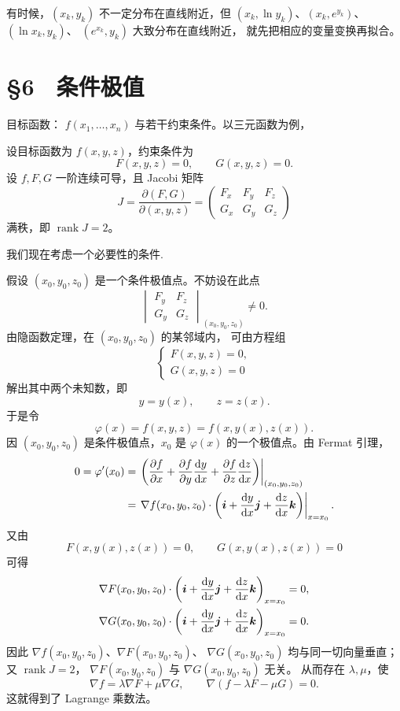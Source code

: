 有时候，$(x_k,y_k)$ 不一定分布在直线附近，但
$(x_k,\ln y_k)$、$(x_k,e^{y_k})$、$(\ln x_k,y_k)$、
$(e^{x_k},y_k)$ 大致分布在直线附近，
就先把相应的变量变换再拟合。







\section*{§6　条件极值}

目标函数： $f(x_1,\ldots,x_n)$ 与若干约束条件。以三元函数为例，


设目标函数为 $f(x,y,z)$，约束条件为
\[
F(x,y,z)=0,\qquad G(x,y,z)=0.
\]
设 $f,F,G$ 一阶连续可导，且 Jacobi 矩阵
\[
J=\frac{\partial(F,G)}{\partial(x,y,z)}
=\begin{pmatrix}
F_x&F_y&F_z\\
G_x&G_y&G_z
\end{pmatrix}
\]
满秩，即 $\operatorname{rank}J=2$。

我们现在考虑一个必要性的条件.

假设 $(x_0,y_0,z_0)$ 是一个条件极值点。不妨设在此点
\[
\begin{vmatrix}
F_y&F_z\\
G_y&G_z
\end{vmatrix}_{(x_0,y_0,z_0)}\ne0.
\]
由隐函数定理，在 $(x_0,y_0,z_0)$ 的某邻域内，
可由方程组
\[
\begin{cases}
F(x,y,z)=0,\\
G(x,y,z)=0
\end{cases}
\]
解出其中两个未知数，即
\[
y=y(x),\qquad z=z(x).
\]
于是令
\[
\varphi(x)=f(x,y,z)=f(x,y(x),z(x)).
\]
因 $(x_0,y_0,z_0)$ 是条件极值点，$x_0$ 是
$\varphi(x)$ 的一个极值点。由 Fermat 引理，
\[
\begin{aligned}
0=\varphi'(x_0)
&=\left.
\left(
\frac{\partial f}{\partial x}
+\frac{\partial f}{\partial y}\frac{\mathrm dy}{\mathrm dx}
+\frac{\partial f}{\partial z}\frac{\mathrm dz}{\mathrm dx}
\right)\right|_{(x_0,y_0,z_0)}\\
&=\left.
\nabla f(x_0,y_0,z_0)\cdot
\left(
\boldsymbol{i}+\frac{\mathrm dy}{\mathrm dx}\boldsymbol{j}
+\frac{\mathrm dz}{\mathrm dx}\boldsymbol{k}
\right)\right|_{x=x_0}.
\end{aligned}
\]
又由
\[
F(x,y(x),z(x))=0,\qquad G(x,y(x),z(x))=0
\]
可得
\[
\begin{aligned}
\nabla F(x_0,y_0,z_0)\cdot
\left(
\boldsymbol{i}+\frac{\mathrm dy}{\mathrm dx}\boldsymbol{j}
+\frac{\mathrm dz}{\mathrm dx}\boldsymbol{k}
\right)_{x=x_0}&=0,\\
\nabla G(x_0,y_0,z_0)\cdot
\left(
\boldsymbol{i}+\frac{\mathrm dy}{\mathrm dx}\boldsymbol{j}
+\frac{\mathrm dz}{\mathrm dx}\boldsymbol{k}
\right)_{x=x_0}&=0.
\end{aligned}
\]
因此 $\nabla f(x_0,y_0,z_0)$、$\nabla F(x_0,y_0,z_0)$、
$\nabla G(x_0,y_0,z_0)$ 均与同一切向量垂直；
又 $\operatorname{rank}J=2$，
$\nabla F(x_0,y_0,z_0)$ 与 $\nabla G(x_0,y_0,z_0)$ 无关。
从而存在 $\lambda,\mu$，使
\[
\nabla f=\lambda\nabla F+\mu\nabla G,
\qquad
\nabla(f-\lambda F-\mu G)=0.
\]
这就得到了 Lagrange 乘数法。



